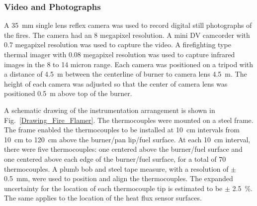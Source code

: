 \documentclass[twoside]{uocthesis}
\begin{document}
{\subsubsection{Video and Photographs}

A 35~mm single lens reflex camera was used to record digital still photographs of the fires.  The camera had an 8 megapixel resolution.  A mini DV camcorder with 0.7 megapixel resolution was used to capture the video.  A firefighting type thermal imager with 0.08 megapixel resolution was used to capture infrared images in the 8 to 14 micron range.  Each camera was positioned on a tripod with a distance of 4.5~m between the centerline of burner to camera lens 4.5~m.  The height of each camera was adjusted so that the center of camera lens was positioned 0.5~m above top of the burner.

A schematic drawing of the instrumentation arrangement is shown in Fig.~\ref{Drawing_Fire_Flamer}.  The thermocouples were mounted on a steel frame.  The frame enabled the thermocouples to be installed at 10~cm intervals from 10~cm to 120~cm above the burner/pan lip/fuel surface. At each 10~cm interval, there were five thermocouples: one centered above the burner/fuel surface and one centered above each edge of the burner/fuel surface, for a total of 70 thermocouples.  A plumb bob and steel tape measure, with a resolution of $\pm$ 0.5~mm, were used to position and align the thermocouples.   The expanded uncertainty for the location of each thermocouple tip is estimated to be $\pm$ 2.5~\%.  The same applies to the location of the heat flux sensor surfaces.

}
\end{document}
